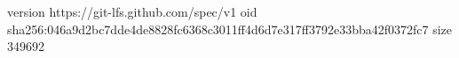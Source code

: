 version https://git-lfs.github.com/spec/v1
oid sha256:046a9d2bc7dde4de8828fc6368c3011ff4d6d7e317ff3792e33bba42f0372fc7
size 349692
